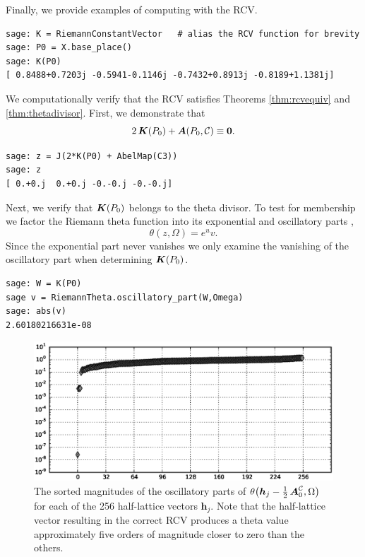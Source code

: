 \begin{example}
Finally, we provide examples of computing with the RCV.
\begin{lstlisting}
sage: K = RiemannConstantVector   # alias the RCV function for brevity
sage: P0 = X.base_place()
sage: K(P0)
[ 0.8488+0.7203j -0.5941-0.1146j -0.7432+0.8913j -0.8189+1.1381j]
\end{lstlisting}
We computationally verify that the RCV satisfies Theorems \ref{thm:rcvequiv} and
\ref{thm:thetadivisor}. First, we demonstrate that
\begin{equation}
  2\operatorname{\boldsymbol{K}}(P_0) + \operatorname{\boldsymbol{A}}(P_0,\operatorname{\mathcal{C}}) \equiv \boldsymbol{0}.
\end{equation}
\begin{lstlisting}
sage: z = J(2*K(P0) + AbelMap(C3))
sage: z
[ 0.+0.j  0.+0.j -0.-0.j -0.-0.j]
\end{lstlisting}
Next, we verify that $\operatorname{\boldsymbol{K}}(P_0)$ belongs to the theta divisor. To test for
membership we factor the Riemann theta function into its exponential and
oscillatory parts \cite{NIST:DLMF,DHBvHS03},
\begin{equation}
  \theta(z,\Omega) = e^u v.
\end{equation}
Since the exponential part never vanishes we only examine the vanishing of the
oscillatory part when determining $\operatorname{\boldsymbol{K}}(P_0)$.
\begin{lstlisting}
sage: W = K(P0)
sage v = RiemannTheta.oscillatory_part(W,Omega)
sage: abs(v)
2.60180216631e-08
\end{lstlisting}


\begin{figure}
  \centering
  \includegraphics[width=\textwidth]{images/oscvalues.eps}
  \caption{The sorted magnitudes of the oscillatory parts of $\theta\big(
    \boldsymbol{h}_j - \tfrac{1}{2}\operatorname{\boldsymbol{A}}_0^{\operatorname{\mathcal{C}}}, \Omega \big)$ for each of
    the 256 half-lattice vectors $\boldsymbol{h}_j$. Note that the half-lattice
    vector resulting in the correct RCV produces a theta value approximately
    five orders of magnitude closer to zero than the others.}
  \label{fig:oscvalues}
\end{figure}


\end{example}
